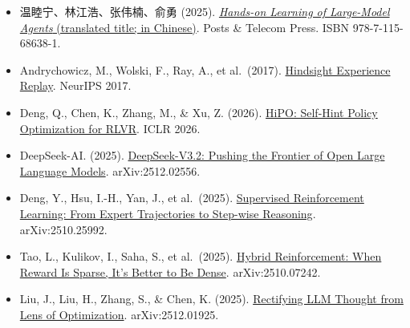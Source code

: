 \vspace{0.25em}
\begin{itemize}
\tightlist
\item
  温睦宁、林江浩、张伟楠、俞勇 (2025). \href{https://haa.boyuai.com/}{\emph{Hands-on Learning of Large-Model Agents} (translated title; in Chinese)}. Posts \& Telecom Press. ISBN 978-7-115-68638-1.
\item
  Andrychowicz, M., Wolski, F., Ray, A., et al.~(2017). \href{https://arxiv.org/abs/1707.01495}{Hindsight Experience Replay}. NeurIPS 2017.
\item
  Deng, Q., Chen, K., Zhang, M., \& Xu, Z. (2026). \href{https://openreview.net/forum?id=rcb20pHmT1}{HiPO: Self-Hint Policy Optimization for RLVR}. ICLR 2026.
\item
  DeepSeek-AI. (2025). \href{https://arxiv.org/abs/2512.02556}{DeepSeek-V3.2: Pushing the Frontier of Open Large Language Models}. arXiv:2512.02556.
\item
  Deng, Y., Hsu, I.-H., Yan, J., et al.~(2025). \href{https://arxiv.org/abs/2510.25992}{Supervised Reinforcement Learning: From Expert Trajectories to Step-wise Reasoning}. arXiv:2510.25992.
\item
  Tao, L., Kulikov, I., Saha, S., et al.~(2025). \href{https://arxiv.org/abs/2510.07242}{Hybrid Reinforcement: When Reward Is Sparse, It's Better to Be Dense}. arXiv:2510.07242.
\item
  Liu, J., Liu, H., Zhang, S., \& Chen, K. (2025). \href{https://arxiv.org/abs/2512.01925}{Rectifying LLM Thought from Lens of Optimization}. arXiv:2512.01925.
\end{itemize}

\clearpage
